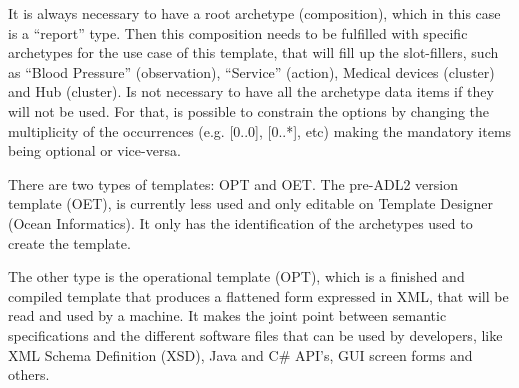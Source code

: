\documentclass[mim_thesis.tex]{subfiles}
\begin{document}
It is always necessary to have a root archetype (composition), which in this case is a “report” type. Then this composition needs to be fulfilled with specific archetypes for the use case of this template, that will fill up the slot-fillers, such as “Blood Pressure” (observation), “Service” (action),  Medical devices (cluster) and Hub (cluster). Is not necessary to have all the archetype data items if they will not be used. For that, is possible to constrain the options by changing the multiplicity of the occurrences (e.g. [0..0], [0..*], etc) making the mandatory items being optional or vice-versa. \citep{Beale2007}

There are two types of templates: \ac{OPT} and \ac{OET}. The pre-ADL2 version template (OET), is currently less used and only editable on Template Designer (Ocean Informatics). It only has the identification of the archetypes used to create the template. 

The other type is the operational template (OPT), which is a finished and compiled template that produces a flattened form expressed in XML, that will be read and used by a machine. It makes the joint point between semantic specifications and the different software files that can be used by developers, like XML Schema Definition (XSD), Java and C\# API’s, GUI screen forms and others.
\end{document}
